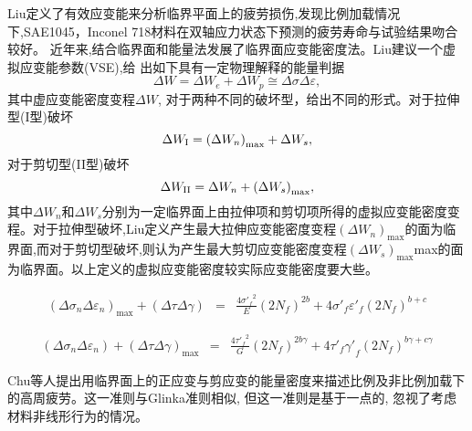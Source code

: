 Liu\cite{Liu1993}定义了有效应变能来分析临界平面上的疲劳损伤,发现比例加载情况下,SAE1045，Inconel 718材料在双轴应力状态下预测的疲劳寿命与试验结果吻合较好。
近年来,结合临界面和能量法发展了临界面应变能密度法。Liu建议一个虚拟应变能参数(VSE),给
出如下具有一定物理解释的能量判据
\begin{equation}
\Delta W = \Delta {W_e} + \Delta {W_p} \cong \Delta \sigma \Delta \varepsilon,
\end{equation}
其中虚应变能密度变程$\Delta W$, 对于两种不同的破坏型，给出不同的形式。对于拉伸型(I型)破坏
\begin{equation}
\Delta {W_{\rm{I}}} = {\left( {\Delta {W_n}} \right)_{\max }} + \Delta {W_s},
\end{equation}
对于剪切型(II型)破坏
\begin{equation}
\Delta {W_{{\rm{II}}}} = \Delta {W_n} + {\left( {\Delta {W_s}} \right)_{\max }},
\end{equation}
其中$\Delta {W_n}$和$\Delta {W_s}$分别为一定临界面上由拉伸项和剪切项所得的虚拟应变能密度变程。对于拉伸型破坏,Liu定义产生最大拉伸应变能密度变程${\left( {\Delta {W_n}} \right)_{\max }}$的面为临界面,而对于剪切型破坏,则认为产生最大剪切应变能密度变程${\left( {\Delta {W_s}} \right)_{\max }}$max的面为临界面。以上定义的虚拟应变能密度较实际应变能密度要大些。

\begin{eqnarray}
{\left( {\Delta {\sigma _n}\Delta {\varepsilon _n}} \right)_{\max }} + \left( {\Delta \tau \Delta \gamma } \right) &=& \frac{{4{{\sigma '}_f}^2}}{E}{\left( {2{N_f}} \right)^{2b}} + 4{{\sigma '}_f}{{\varepsilon '}_f}{\left( {2{N_f}} \right)^{b + c}}
\end{eqnarray}

\begin{eqnarray}
\left( {\Delta {\sigma _n}\Delta {\varepsilon _n}} \right) + {\left( {\Delta \tau \Delta \gamma } \right)_{\max }} &=& \frac{{4{{\tau '}_f}^2}}{G}{\left( {2{N_f}} \right)^{2b\gamma }} + 4{{\tau '}_f}{{\gamma '}_f}{\left( {2{N_f}} \right)^{b\gamma  + c\gamma }}
\end{eqnarray}

Chu\cite{Chu1993,Chu1995}等人提出用临界面上的正应变与剪应变的能量密度来描述比例及非比例加载下的高周疲劳。这一准则与Glinka准则相似, 但这一准则是基于一点的, 忽视了考虑材料非线形行为的情况。


